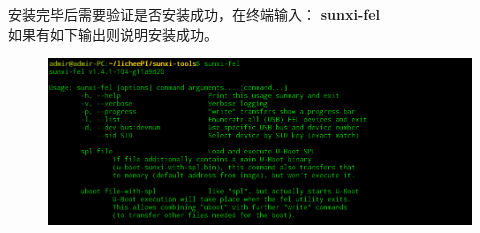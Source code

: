 \noindent
安装完毕后需要验证是否安装成功，在终端输入：
\textbf{sunxi-fel}   \\
如果有如下输出则说明安装成功。
\begin{figure}[htbp]
	\centering
	\includegraphics[width=1\linewidth]{chapter2/img/chapter2-2-1}
	\caption{}
	\label{fig:chapter1-2-1}
\end{figure}


